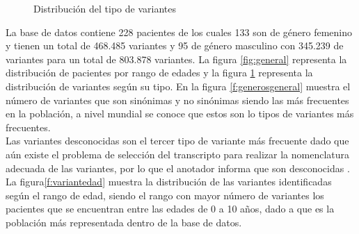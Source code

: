 \begin{figure}[H]
	\centering
	\caption{Distribución del tipo de variantes}
	\label{f:variantesgeneral}
\end{figure}

La base de datos contiene 228 pacientes de los cuales 133 son de género femenino y tienen un total de 468.485 variantes y 95 de género masculino con 345.239 de variantes para un total de 803.878 variantes. La  figura \ref{fig:general} representa la distribución de pacientes por rango de edades y la figura \ref{f:variantesgeneral} representa la distribución de variantes según su tipo. En la figura \ref{f:generosgeneral} muestra el número de variantes que son sinónimas y no sinónimas siendo las más frecuentes en la población, a  nivel mundial se conoce que estos son lo tipos de variantes más frecuentes\cite{Fu2013}.\\

Las variantes desconocidas son el tercer tipo de variante más frecuente dado que aún existe el problema de selección del transcripto para realizar la nomenclatura adecuada de las variantes, por lo que el anotador informa que son desconocidas \cite{McCarthy2014}. La figura\ref{f:variantedad} muestra la distribución de las variantes identificadas según el rango de edad, siendo el rango con mayor número de variantes los pacientes que se encuentran entre las edades de 0 a 10 años, dado a que es la población más representada dentro de la base de datos. \\

